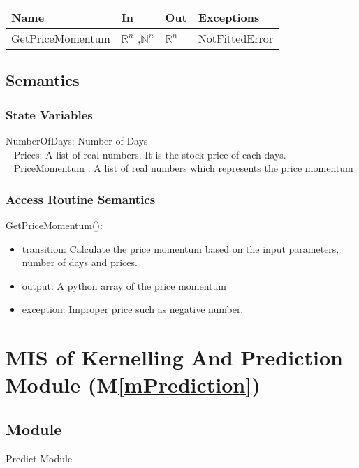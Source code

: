 \documentclass[12pt, titlepage]{article}
\newcommand{\mref}[1]{M\ref{#1}}
\begin{document}
\begin{center}
\begin{tabular}{p{4cm} p{2cm} p{2cm} p{4cm}}
\hline
\textbf{Name} & \textbf{In} & \textbf{Out} & \textbf{Exceptions} \\
\hline

GetPriceMomentum & $\mathbb{R}^n$ ,$\mathbb{N}^n$ & $\mathbb{R}^n$ & NotFittedError \\
\hline
\end{tabular}
\end{center}

\subsection{Semantics}
\subsubsection{State Variables}
NumberOfDays: Number of Days\\ 
~\newline
Prices: A list of real numbers. It is the stock price of each days.\\
~\newline
PriceMomentum : A list of real numbers which represents the price momentum\\

\subsubsection{Access Routine Semantics}

\noindent GetPriceMomentum():
\begin{itemize}
\item transition: Calculate the price momentum based on the input parameters, number of days and prices.
\item output: A python array of the price momentum
\item exception: Improper price such as negative number.
\end{itemize}

\section{MIS of Kernelling And Prediction Module (\mref{mPrediction}) } 

\subsection{Module}
Predict Module
\end{document}

